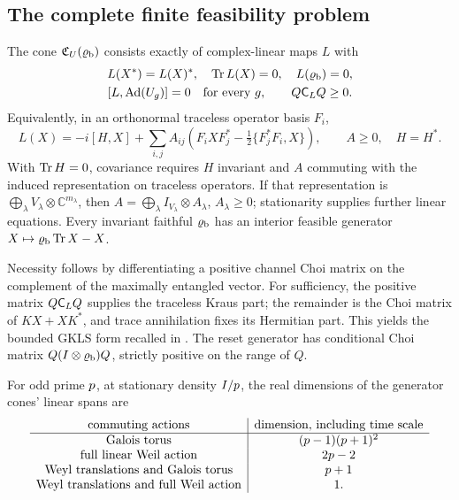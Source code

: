\subsection{The complete finite feasibility problem}

\begin{theorem}
\label{thm:bc-covariant-gks-cone}
The cone $\mathfrak C_U(\varrho_{\mathrm b})$ consists exactly of complex-linear maps $L$ with
\[
 \begin{gathered}
 L(X^*)=L(X)^*,\quad \Tr L(X)=0,\quad L(\BCbond)=0,\\
 [L,\Ad(U_g)]=0\quad\hbox{for every }g,\qquad Q\Choi_LQ\ge0.
 \end{gathered}
\]
Equivalently, in an orthonormal traceless operator basis $F_i$,
\[
 L(X)=-i[H,X]+\sum_{i,j}A_{ij}
 \left(F_iXF_j^*-\tfrac12\{F_j^*F_i,X\}\right),\qquad A\ge0,\quad H=H^*.
\]
With $\operatorname{Tr} H=0$, covariance requires $H$ invariant and $A$ commuting with
the induced representation on traceless operators. If that representation
is $\bigoplus_\lambda V_\lambda\otimes\mathbb C^{m_\lambda}$, then
$A=\bigoplus_\lambda I_{V_\lambda}\otimes A_\lambda$, $A_\lambda\ge0$;
stationarity supplies further linear equations. Every invariant faithful
$\varrho_{\mathrm b}$ has an interior feasible generator $X\mapsto\varrho_{\mathrm b}\operatorname{Tr} X-X$.
\end{theorem}

Necessity follows by differentiating a positive channel Choi matrix on
the complement of the maximally entangled vector. For sufficiency, the
positive matrix $Q\mathsf C_LQ$ supplies the traceless Kraus part; the remainder
is the Choi matrix of $KX+XK^*$, and trace annihilation fixes its Hermitian
part. This yields the bounded GKLS form recalled in
\cite{siemon2017unbounded}. The reset generator has conditional Choi matrix
$Q(I\otimes\varrho_{\mathrm b})Q$, strictly positive on the range of $Q$.

\begin{theorem}
\label{thm:bc-critical-cone-dimensions}
For odd prime $p$, at stationary density $I/p$, the real dimensions
of the generator cones' linear spans are
\[
\begin{array}{c|c}
\text{commuting actions}&\text{dimension, including time scale}\\ \hline
\text{Galois torus}&(p-1)(p+1)^2\\
\text{full linear Weil action}&2p-2\\
\text{Weyl translations and Galois torus}&p+1\\
\text{Weyl translations and full Weil action}&1.
\end{array}
\]
\end{theorem}

